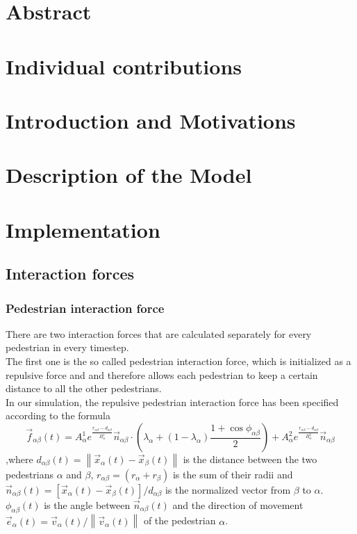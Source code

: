 \documentclass[11pt]{article}
\begin{document}



\section{Abstract}

\section{Individual contributions}

\section{Introduction and Motivations}

\section{Description of the Model}

\section{Implementation}
\subsection{Interaction forces}
\subsubsection{Pedestrian interaction force}
There are two interaction forces that are calculated separately for every pedestrian in every timestep. \\
The first one is the so called pedestrian interaction force, which is initialized as a repulsive force and and therefore allows each pedestrian to keep a certain distance to all the other pedestrians. \\
In our simulation, the repulsive pedestrian interaction force has been specified according to the formula
%
\begin{equation}
\vec{f}_{\alpha\beta}(t) = A_\alpha ^1 e^{\frac{r_{\alpha\beta} -d_{\alpha\beta}}{B_\alpha ^1}}\vec{n}_{\alpha\beta}
\cdot{\left(\lambda _\alpha + (1-\lambda _\alpha)
\frac{1+\cos{\phi_{\alpha\beta}}}{2}\right)}
+ A_\alpha ^2 e^{\frac{r_{\alpha\beta} -d_{\alpha\beta}}{B_\alpha ^2}}\vec{n}_{\alpha\beta}
\end{equation}
%
,where 
\(d_{\alpha\beta}(t)=\left\|\vec{x}_\alpha (t)-\vec{x}_\beta (t)\right\|\)
is the distance between the two pedestrians $\alpha$ and $\beta$, \(r_{\alpha\beta}=(r_\alpha + r_\beta)\) is the sum of their radii and 
\(\vec{n}_{\alpha\beta}(t)=[\vec{x}_\alpha(t)-\vec{x}_\beta(t)]/d_{\alpha\beta}\)
is the normalized vector from $\beta$ to $\alpha$.
\( \phi_{\alpha\beta}(t) \) is the angle between \(\vec{n}_{\alpha\beta}(t)\) and the direction of movement \( \vec{e}_\alpha(t)=\vec{v}_\alpha(t)/\left\|\vec{v}_\alpha(t)\right\| \) of the pedestrian $\alpha$.
\end{document}
